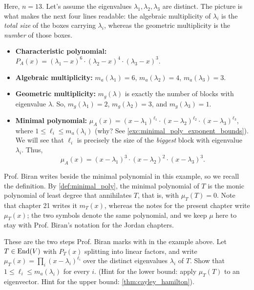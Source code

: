 \begin{example}
Here, $n = 13$. Let's assume the eigenvalues $\lambda_1, \lambda_2, \lambda_3$ are distinct. The picture is what makes the next four lines readable: the algebraic multiplicity of $\lambda_i$ is the \emph{total size} of the boxes carrying $\lambda_i$, whereas the geometric multiplicity is the \emph{number} of those boxes.
\begin{itemize}
    \item \textbf{Characteristic polynomial:} $P_A(x) = (\lambda_1 - x)^6 \cdot (\lambda_2 - x)^4 \cdot (\lambda_3 - x)^3$.
    \item \textbf{Algebraic multiplicity:} $m_a(\lambda_1) = 6$, $m_a(\lambda_2) = 4$, $m_a(\lambda_3) = 3$.
    \item \textbf{Geometric multiplicity:} $m_g(\lambda)$ is exactly the number of blocks with eigenvalue $\lambda$. So, $m_g(\lambda_1) = 2$, $m_g(\lambda_2) = 3$, and $m_g(\lambda_3) = 1$.
    \item \textbf{Minimal polynomial:} $\mu_A(x) = (x - \lambda_1)^{\ell_1} \cdot (x - \lambda_2)^{\ell_2} \cdot (x - \lambda_3)^{\ell_3}$, where $1 \le \ell_i \le m_a(\lambda_i)$ (why? See \cref{exc:minimal_poly_exponent_bounds}). We will see that $\ell_i$ is precisely the size of the \emph{biggest} block with eigenvalue $\lambda_i$. Thus,
    \[
    \mu_A(x) = (x - \lambda_1)^3 \cdot (x - \lambda_2)^2 \cdot (x - \lambda_3)^3.
    \]
\end{itemize}
\end{example}

\begin{remark}
Prof. Biran writes  beside the minimal polynomial in this example, so we recall the definition. By \cref{def:minimal_poly}, the minimal polynomial of $T$ is the monic polynomial of least degree that annihilates $T$, that is, with $\mu_T(T) = 0$. Note that chapter 21 writes it $m_T(x)$, whereas the notes for the present chapter write $\mu_T(x)$; the two symbols denote the same polynomial, and we keep $\mu$ here to stay with Prof. Biran's notation for the Jordan chapters.
\end{remark}

\begin{exercise}
\label{exc:minimal_poly_exponent_bounds}
These are the two steps Prof. Biran marks with  in the example above. Let $T \in \operatorname{End}(V)$ with $P_T(x)$ splitting into linear factors, and write $\mu_T(x) = \prod_i (x - \lambda_i)^{\ell_i}$ over the distinct eigenvalues $\lambda_i$ of $T$. Show that $1 \le \ell_i \le m_a(\lambda_i)$ for every $i$. (Hint for the lower bound: apply $\mu_T(T)$ to an eigenvector. Hint for the upper bound: \cref{thm:cayley_hamilton}).
\end{exercise}


